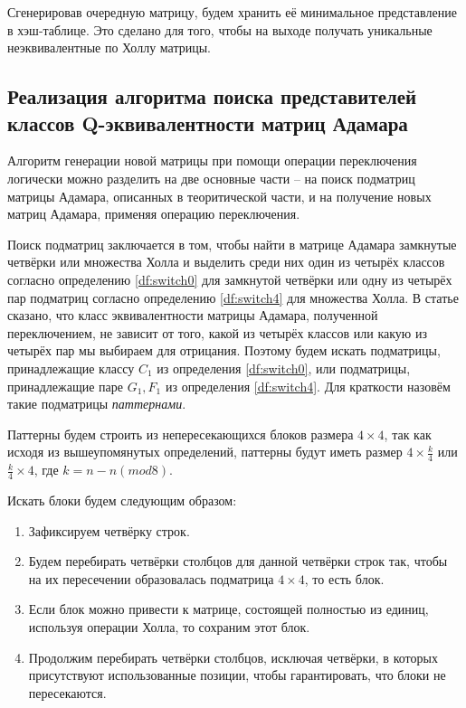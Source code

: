 \documentclass[a4paper, 14pt]{extreport}
\begin{document}
Сгенерировав очередную матрицу, будем хранить её минимальное представление в хэш-таблице. Это сделано для того, чтобы на выходе получать уникальные неэквивалентные по Холлу матрицы.

\subsection{Реализация алгоритма поиска представителей классов Q-эквивалентности матриц Адамара}

Алгоритм генерации новой матрицы при помощи операции переключения логически можно разделить на две основные части -- на поиск подматриц матрицы Адамара, описанных в теоритической части, и на получение новых матриц Адамара, применяя операцию переключения.

Поиск подматриц заключается в том, чтобы найти в матрице Адамара замкнутые четвёрки или множества Холла и выделить среди них один из четырёх классов согласно определению \ref{df:switch0} для замкнутой четвёрки или одну из четырёх пар подматриц согласно определению \ref{df:switch4} для множества Холла. В статье \cite{orrick:so} сказано, что класс эквивалентности матрицы Адамара, полученной переключением, не зависит от того, какой из четырёх классов или какую из четырёх пар мы выбираем для отрицания. Поэтому будем искать подматрицы, принадлежащие классу $C_1$ из определения \ref{df:switch0}, или подматрицы, принадлежащие паре $G_1, F_1$ из определения \ref{df:switch4}. Для краткости назовём такие подматрицы {\it паттернами}.

Паттерны будем строить из непересекающихся блоков размера $4 \times 4$, так как исходя из вышеупомянутых определений, паттерны будут иметь размер $4 \times \frac{k}{4}$ или $\frac{k}{4} \times 4$, где $k = n - n(mod8)$.

Искать блоки будем следующим образом:
\begin{enumerate}
    \item Зафиксируем четвёрку строк.
    \item Будем перебирать четвёрки столбцов для данной четвёрки строк так, чтобы на их пересечении образовалась подматрица $4 \times 4$, то есть блок.
    \item Если блок можно привести к матрице, состоящей полностью из единиц, используя операции Холла, то сохраним этот блок.
    \item Продолжим перебирать четвёрки столбцов, исключая четвёрки, в которых присутствуют использованные позиции, чтобы гарантировать, что блоки не пересекаются.
\end{enumerate}
\end{document}
